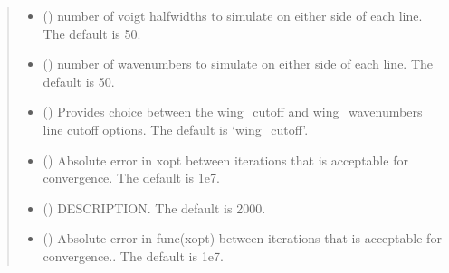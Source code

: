 \documentclass[letterpaper,10pt,english]{sphinxmanual}
\begin{document}
\begin{fulllineitems}
\begin{fulllineitems}
\begin{quote}
\begin{description}
\begin{itemize}
\item {} 
\sphinxAtStartPar
{} (\sphinxstyleliteralemphasis{\sphinxupquote{, }}) \textendash{} number of voigt half\sphinxhyphen{}widths to simulate on either side of each line. The default is 50.

\item {} 
\sphinxAtStartPar
{} (\sphinxstyleliteralemphasis{\sphinxupquote{, }}) \textendash{} number of wavenumbers to simulate on either side of each line. The default is 50.

\item {} 
\sphinxAtStartPar
{} (\sphinxstyleliteralemphasis{\sphinxupquote{, }}) \textendash{} Provides choice between the wing\_cutoff and wing\_wavenumbers line cut\sphinxhyphen{}off options. The default is ‘wing\_cutoff’.

\item {} 
\sphinxAtStartPar
{} (\sphinxstyleliteralemphasis{\sphinxupquote{, }}) \textendash{} Absolute error in xopt between iterations that is acceptable for convergence. The default is 1e\sphinxhyphen{}7.

\item {} 
\sphinxAtStartPar
{} (\sphinxstyleliteralemphasis{\sphinxupquote{, }}) \textendash{} DESCRIPTION. The default is 2000.

\item {} 
\sphinxAtStartPar
{} (\sphinxstyleliteralemphasis{\sphinxupquote{, }}) \textendash{} Absolute error in func(xopt) between iterations that is acceptable for convergence.. The default is 1e\sphinxhyphen{}7.


\end{itemize}
\end{description}
\end{quote}
\end{fulllineitems}
\end{fulllineitems}
\end{document}
